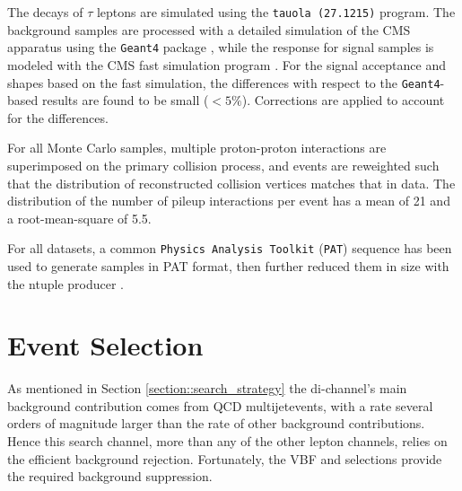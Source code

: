 The decays of $\tau$ leptons are simulated using the \texttt{tauola (27.1215)} \cite{Davidson:2010rw} program. The background samples are processed with a detailed simulation of the CMS apparatus using the \texttt{Geant4} package \cite{Agostinelli:2002hh}, while the response for signal samples is modeled with the CMS fast simulation program \cite{Abdullin:2011zz}. For the signal acceptance and \mjj shapes based on the fast simulation, the differences with respect to the \texttt{Geant4}-based results are found to be small ($< 5\%$). Corrections are applied to account for the differences. 

For all Monte Carlo samples, multiple proton-proton interactions are superimposed on the primary collision process, and events are reweighted such that the distribution of reconstructed collision vertices matches that in data. The distribution of the number of pileup interactions per event has a mean of 21 and a root-mean-square of 5.5. 

For all datasets, a common \texttt{Physics Analysis Toolkit} (\texttt{PAT}) \cite{Adam:2010zza} sequence has been used to generate samples in PAT format, then further reduced them in size with the ntuple producer \cite{bib:thentuplemaker}.



\section{Event Selection}
\label{sec:eventselection}
\FloatBarrier



As mentioned in Section \ref{section::search_strategy} the di-\hadtau channel's main background contribution comes from QCD multijetevents, with a rate several orders of magnitude larger than the rate of other background contributions. Hence this search channel, more than any of the other lepton channels, relies on the efficient background rejection. Fortunately, the VBF and \met selections provide the required background suppression.

